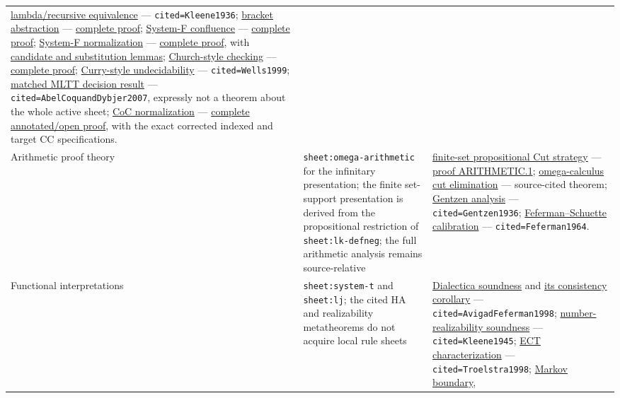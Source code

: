 \begin{landscape}
\begin{longtable}{@{}p{.82in}p{2.05in}p{4.95in}@{}}
\hyperref[thm:p07-lambda-partial-recursive]{lambda/recursive equivalence}
--- \texttt{cited=Kleene1936};
\hyperref[thm:p07-bracket-abstraction]{bracket abstraction}
--- \hyperref[annex:p07.combinatory.bracket-abstraction]{complete proof};
\hyperref[thm:p07-system-f-confluence]{System-F confluence}
--- \hyperref[annex:p7.system-f.confluence]{complete proof};
\hyperref[thm:p07-system-f-strong-normalization]{System-F normalization}
--- \hyperref[annex:p7.system-f.strong-normalization]{complete proof}, with
\hyperref[sec:p07-system-f-normalization]{candidate and substitution lemmas};
\hyperref[thm:p07-system-f-church-checking]{Church-style checking}
--- \hyperref[annex:p7.system-f.church-checking]{complete proof};
\hyperref[thm:p07-system-f-curry-undecidable]{Curry-style undecidability}
--- \texttt{cited=Wells1999};
\hyperref[thm:p07-mltt-normalization-decision]{matched MLTT decision result}
--- \texttt{cited=AbelCoquandDybjer2007}, expressly not a theorem about the
whole active sheet;
\hyperref[thm:p07-coc-strong-normalization]{CoC normalization}
--- \hyperref[annex:p7.ch88.full-normalization]{complete annotated/open proof},
with the exact corrected indexed and target CC specifications. \\
\addlinespace
Arithmetic proof theory &
\texttt{sheet:omega-arithmetic} for the infinitary presentation; the finite
set-support presentation is derived from the propositional restriction of
\texttt{sheet:lk-defneg}; the full arithmetic analysis remains source-relative &
\hyperref[thm:p07-prop-cut-termination]{finite-set propositional Cut strategy}
--- \hyperref[annex:p7.arithmetic.1]{proof ARITHMETIC.1};
\hyperref[thm:p07-omega-cut-elimination]{omega-calculus cut elimination}
--- source-cited theorem;
\hyperref[sec:normalization-curry-howard-04]{Gentzen analysis}
--- \texttt{cited=Gentzen1936};
\hyperref[thm:p07-feferman-schuette]{Feferman--Schuette calibration}
--- \texttt{cited=Feferman1964}. \\
\addlinespace
Functional interpretations &
\texttt{sheet:system-t} and \texttt{sheet:lj}; the cited HA and
realizability metatheorems do not acquire local rule sheets &
\hyperref[thm:p07-dialectica-soundness]{Dialectica soundness} and
\hyperref[thm:p07-dialectica-consistency]{its consistency corollary}
--- \texttt{cited=AvigadFeferman1998};
\hyperref[thm:p07-number-realizability-soundness]{number-realizability soundness}
--- \texttt{cited=Kleene1945};
\hyperref[thm:p07-ect-characterization]{ECT characterization}
--- \texttt{cited=Troelstra1998};
\hyperref[thm:p07-markov-realizability-boundary]{Markov boundary},

\end{longtable}
\end{landscape}
